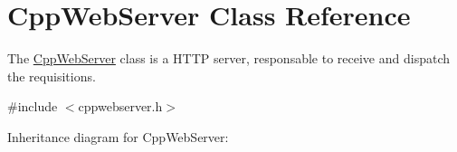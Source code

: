 \hypertarget{class_cpp_web_server}{}\section{Cpp\+Web\+Server Class Reference}
\label{class_cpp_web_server}


The \mbox{\hyperlink{class_cpp_web_server}{Cpp\+Web\+Server}} class is a H\+T\+TP server, responsable to receive and dispatch the requisitions.  




{\ttfamily \#include $<$cppwebserver.\+h$>$}



Inheritance diagram for Cpp\+Web\+Server\+:
